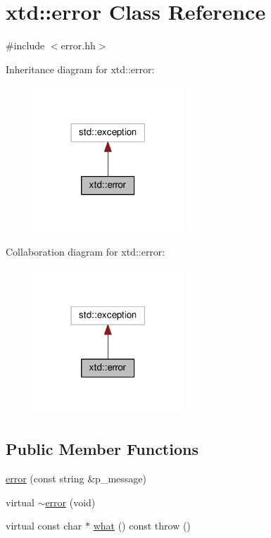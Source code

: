 \hypertarget{classxtd_1_1error}{}\section{xtd\+:\+:error Class Reference}
\label{classxtd_1_1error}


{\ttfamily \#include $<$error.\+hh$>$}



Inheritance diagram for xtd\+:\+:error\+:
\nopagebreak
\begin{figure}[H]
\begin{center}
\leavevmode
\includegraphics[width=158pt]{classxtd_1_1error__inherit__graph}
\end{center}
\end{figure}


Collaboration diagram for xtd\+:\+:error\+:
\nopagebreak
\begin{figure}[H]
\begin{center}
\leavevmode
\includegraphics[width=158pt]{classxtd_1_1error__coll__graph}
\end{center}
\end{figure}
\subsection*{Public Member Functions}
\begin{DoxyCompactItemize}
\item 
\hyperlink{classxtd_1_1error_a4663571e50d7bcf512b353660b897a55}{error} (const string \&p\+\_\+message)
\item 
virtual \hyperlink{classxtd_1_1error_abeceaf42dfbad136014dc3921696e26f}{$\sim$error} (void)
\item 
virtual const char $\ast$ \hyperlink{classxtd_1_1error_a463ff8177561abd418c1f00aa2bcd154}{what} () const   throw ()
\end{DoxyCompactItemize}
